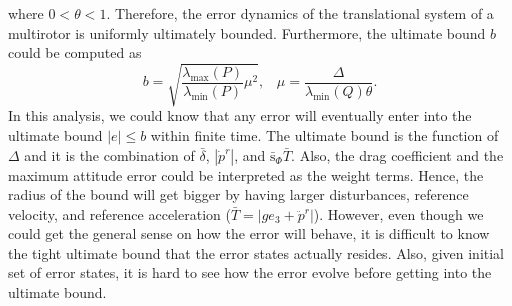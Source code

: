 \documentclass[letterpaper, 10 pt, conference]{ieeeconf}  %
\begin{document}
where $0<\theta<1$. 
Therefore, the error dynamics of the translational system of a multirotor is uniformly ultimately bounded. Furthermore, the ultimate bound $b$ could be computed as 
\begin{equation}
b = \sqrt{\frac{\lambda_{\max}(P)}{\lambda_{\min}(P)}\mu^2},\;\;\;
\mu = \frac{\Delta}{\lambda_{\min}(Q)\theta}. 
\label{eq:expected}
\end{equation}
In this analysis, we could know that any error will eventually enter into the ultimate bound $|e| \leq b$ within finite time. 
The ultimate bound is the function of $\Delta$ and it is the combination of $\bar{\delta}$, $|\dot{p}^r|$, and $\bar{\text{s}}_\Phi\bar{T}$. Also, the drag coefficient and the maximum attitude error could be interpreted as the weight terms. 
Hence, the radius of the bound will get bigger by having larger disturbances, reference velocity, and reference acceleration ($\bar{T} = |ge_3 + \ddot{p}^r|$). 
However, even though we could get the general sense on how the error will behave, 
it is difficult to know the tight ultimate bound that the error states actually resides. 
Also, given initial set of error states, it is hard to see how the error evolve before getting into the ultimate bound.
\end{document}
